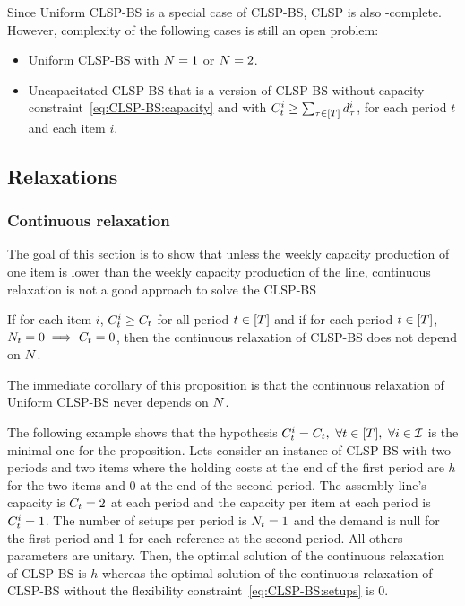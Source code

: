 Since Uniform CLSP-BS is a special case of CLSP-BS, CLSP is also \NP-complete. However, complexity of the following cases is still an open problem:
\begin{itemize}
\item Uniform CLSP-BS with $N=1$ or $N=2$.
\item Uncapacitated CLSP-BS that is a version of CLSP-BS without capacity constraint~\eqref{eq:CLSP-BS:capacity} and with $\capacity_t^i\ge\sum_{\tau\in\range{\horizon}}\demand_{\tau}^i$, for each period $t$ and each item $i$.
\end{itemize}



\subsection{Relaxations}

\subsubsection{Continuous relaxation}

The goal of this section is to show that unless the weekly capacity production of one item is lower than the weekly capacity production of the line, continuous relaxation is not a good approach to solve the CLSP-BS

\begin{prop}\label{prop:relaxation-independant-N}
If for each item $i$, $C_t^i\ge C_t$ for all period $t\in\range{\horizon}$ and if for each period $t\in\range{\horizon}$, $N_t=0\implies C_t=0$, then the continuous relaxation of CLSP-BS does not depend on $N$.
\end{prop}

The immediate corollary of this proposition is that the continuous relaxation of Uniform CLSP-BS never depends on $N$.


The following example shows that the hypothesis $\capacity_t^i=\capacity_t,\ \forall t\in\range{\horizon},\ \forall i\in\REF$ is the minimal one for the proposition. Lets consider an instance of CLSP-BS  with two periods and two items where the holding costs at the end of the first period are $h$ for the two items and 0 at the end of the second period. The assembly line's capacity is $C_t=2$ at each period and the capacity per item at each period is $C_t^i=1$. The number of setups per period is $N_t=1$ and the demand is null for the first period and 1 for each reference at the second period. All others parameters are unitary. Then, the optimal solution of the continuous relaxation of CLSP-BS is $h$ whereas the optimal solution of the continuous relaxation of CLSP-BS without the flexibility constraint~\eqref{eq:CLSP-BS:setups} is 0.


